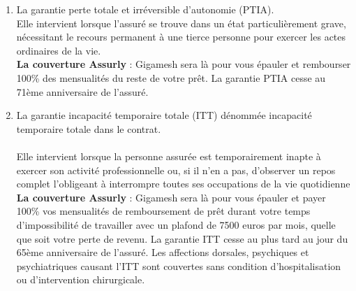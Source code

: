 \begin{enumerate}
	\item La garantie perte totale et irréversible d’autonomie (PTIA).\\
	
Elle intervient lorsque l’assuré se trouve dans un état particulièrement grave, nécessitant le recours permanent à une tierce personne pour exercer les actes ordinaires de la vie.\\

\textbf{La couverture Assurly} : Gigamesh sera là pour vous épauler et rembourser 100\% des mensualités du reste de votre prêt. La garantie PTIA cesse au 71ème anniversaire de l’assuré.

\item La garantie incapacité temporaire totale (ITT) dénommée incapacité temporaire totale dans le contrat.\\ \\ Elle intervient lorsque la personne assurée est temporairement inapte à exercer son activité professionnelle ou, si il n’en a pas, d’observer un repos complet l’obligeant à interrompre toutes ses occupations de la vie
quotidienne\\
\textbf{La couverture Assurly} : Gigamesh sera là pour vous épauler et payer 100\% vos mensualités de remboursement de prêt durant votre temps d’impossibilité de travailler avec un plafond de 7500 euros par mois, quelle que soit votre perte de revenu. La garantie ITT cesse au plus tard au jour du 65ème anniversaire de l’assuré. Les affections dorsales, psychiques et psychiatriques causant l’ITT sont couvertes sans condition d’hospitalisation
ou d’intervention chirurgicale.
\end{enumerate}
